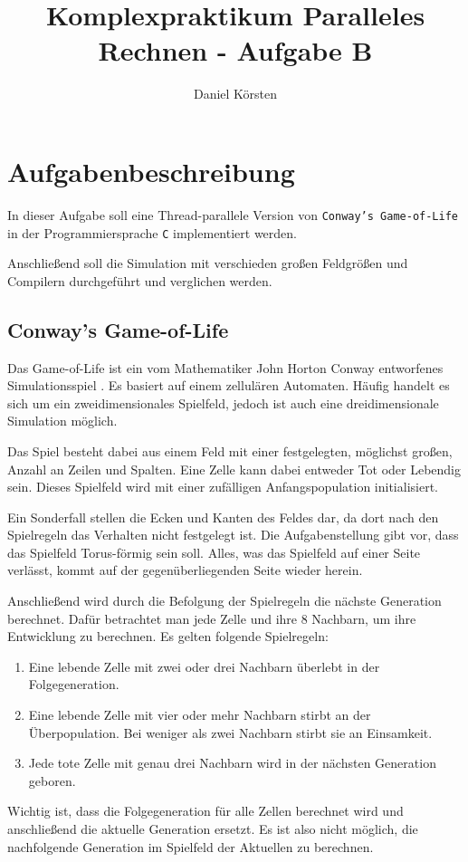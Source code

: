 \documentclass[german,plainarticle,hyperref,utf8]{zihpub}
\author{Daniel Körsten}
\title{Komplexpraktikum Paralleles Rechnen - Aufgabe B}
\begin{document}
	\section{Aufgabenbeschreibung}
	In dieser Aufgabe soll eine Thread-parallele Version von \texttt{Conway’s Game-of-Life} in der Programmiersprache \texttt{C} implementiert werden.
	
	Anschließend soll die Simulation mit verschieden großen Feldgrößen und Compilern durchgeführt und verglichen werden.
	
	\subsection{Conway’s Game-of-Life}
	Das Game-of-Life ist ein vom Mathematiker John Horton Conway entworfenes Simulationsspiel \cite{gardner}. Es basiert auf einem zellulären Automaten. Häufig handelt es sich um ein zweidimensionales Spielfeld, jedoch ist auch eine dreidimensionale Simulation möglich.
	
	Das Spiel besteht dabei aus einem Feld mit einer festgelegten, möglichst großen, Anzahl an Zeilen und Spalten. Eine Zelle kann dabei entweder Tot oder Lebendig sein. Dieses Spielfeld wird mit einer zufälligen Anfangspopulation initialisiert.
	
	Ein Sonderfall stellen die Ecken und Kanten des Feldes dar, da dort nach den Spielregeln das Verhalten nicht festgelegt ist. Die Aufgabenstellung gibt vor, dass das Spielfeld Torus-förmig sein soll. Alles, was das Spielfeld auf einer Seite verlässt, kommt auf der gegenüberliegenden Seite wieder herein.
	
	Anschließend wird durch die Befolgung der Spielregeln die nächste Generation berechnet. Dafür betrachtet man jede Zelle und ihre 8 Nachbarn, um ihre Entwicklung zu berechnen. Es gelten folgende Spielregeln:
	\begin{enumerate}
		\item Eine lebende Zelle mit zwei oder drei Nachbarn überlebt in der Folgegeneration.
		\item Eine lebende Zelle mit vier oder mehr Nachbarn stirbt an der Überpopulation. Bei weniger als zwei Nachbarn stirbt sie an Einsamkeit.
		\item Jede tote Zelle mit genau drei Nachbarn wird in der nächsten Generation geboren.
	\end{enumerate}
	Wichtig ist, dass die Folgegeneration für alle Zellen berechnet wird und anschließend die aktuelle Generation ersetzt. Es ist also nicht möglich, die nachfolgende Generation im Spielfeld der Aktuellen zu berechnen.
	
\end{document}
